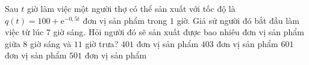 \begin{ex}%
	Sau $t$ giờ làm việc một người thợ có thể sản xuất với tốc độ là $q(t)=100+\mathrm{e}^{-0{,}5t}$ đơn vị sản phẩm trong $1$ giờ. Giả sử người đó bắt đầu làm việc từ lúc $7$ giờ sáng. Hỏi người đó sẽ sản xuất được bao nhiêu đơn vị sản phẩm giữa $8$ giờ sáng và $11$ giờ trưa?
	\choice
	{\True $401$ đơn vị sản phẩm}
	{$403$ đơn vị sản phẩm}
	{$601$ đơn vị sản phẩm}
	{$501$ đơn vị sản phẩm}
\end{ex}

